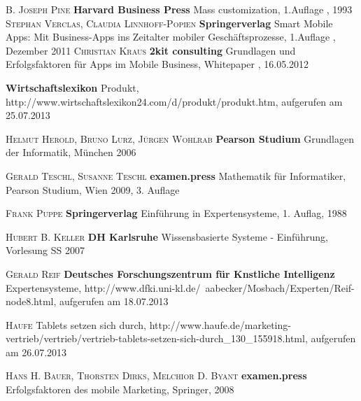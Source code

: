 \begin{thebibliography}{---}
             \textsc{B. Joseph Pine}
            \textbf{Harvard Business Press}
            Mass customization, 1.Auflage , 1993
             \textsc{Stephan Verclas, Claudia Linnhoff-Popien}
            \textbf{Springerverlag}
            Smart Mobile Apps: Mit Business-Apps ins Zeitalter mobiler Geschäftsprozesse, 1.Auflage , Dezember 2011
             \textsc{Christian Kraus}
            \textbf{2kit consulting}
            Grundlagen und Erfolgsfaktoren 
            für Apps im Mobile Business, Whitepaper , 16.05.2012

            \textbf{Wirtschaftslexikon}
            Produkt, http://www.wirtschaftslexikon24.com/d/produkt/produkt.htm, aufgerufen am 25.07.2013
            
 			\textsc{Helmut Herold, Bruno Lurz, Jürgen Wohlrab}
             \textbf{Pearson Studium}
             Grundlagen der Informatik, München 2006
             
  			\textsc{Gerald Teschl, Susanne Teschl}
              \textbf{examen.press}
              Mathematik
              für Informatiker, Pearson Studium, Wien 2009, 3. Auflage
              
 
              			 
 			 \textsc{Frank Puppe}
 			 \textbf{Springerverlag}
 			 Einführung in Expertensysteme, 1. Auflag, 1988
 			 
  			 \textsc{Hubert B. Keller}
  			 \textbf{DH Karlsruhe}
  			 Wissensbasierte Systeme - Einführung, Vorlesung SS 2007
  			 
			\textsc{Gerald Reif}
            \textbf{Deutsches Forschungszentrum für Knstliche Intelligenz}
            Expertensysteme, http://www.dfki.uni-kl.de/~aabecker/Mosbach/Experten/Reif-node8.html, aufgerufen am 18.07.2013
 
            \textsc{Haufe}
           Tablets setzen sich durch, http://www.haufe.de/marketing-vertrieb/vertrieb/vertrieb-tablets-setzen-sich-durch\_130\_155918.html, aufgerufen am 26.07.2013           
            
   			\textsc{Hans H. Bauer, Thorsten Dirks, Melchior D. Byant}
               \textbf{examen.press}
               Erfolgsfaktoren des mobile Marketing, Springer, 2008
               

\end{thebibliography}
